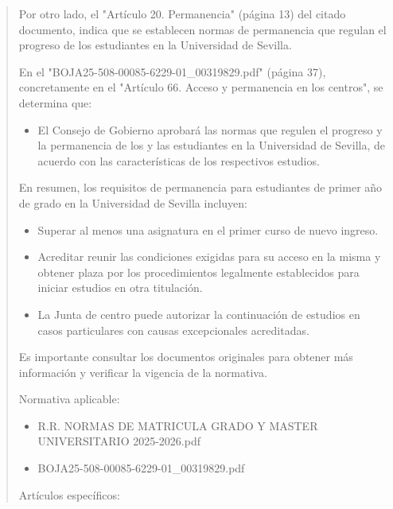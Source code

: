 \documentclass[12pt,a4paper,oneside]{report}
\begin{document}
\begin{itemize}
\begin{itemize}
\begin{quote}
Por otro lado, el "Artículo 20. Permanencia" (página 13) del citado documento, indica que se establecen normas de permanencia que regulan el progreso de los estudiantes en la Universidad de Sevilla.

En el "BOJA25-508-00085-6229-01\_00319829.pdf" (página 37), concretamente en el "Artículo 66. Acceso y permanencia en los centros", se determina que:

\begin{itemize}
  \item El Consejo de Gobierno aprobará las normas que regulen el progreso y la permanencia de los y las estudiantes en la Universidad de Sevilla, de acuerdo con las características de los respectivos estudios.
\end{itemize}

En resumen, los requisitos de permanencia para estudiantes de primer año de grado en la Universidad de Sevilla incluyen:

\begin{itemize}
  \item Superar al menos una asignatura en el primer curso de nuevo ingreso.
  \item Acreditar reunir las condiciones exigidas para su acceso en la misma y obtener plaza por los procedimientos legalmente establecidos para iniciar estudios en otra titulación.
  \item La Junta de centro puede autorizar la continuación de estudios en casos particulares con causas excepcionales acreditadas.
\end{itemize}

Es importante consultar los documentos originales para obtener más información y verificar la vigencia de la normativa. 

Normativa aplicable:

\begin{itemize}
  \item R.R. NORMAS DE MATRICULA GRADO Y MASTER UNIVERSITARIO 2025-2026.pdf
  \item BOJA25-508-00085-6229-01\_00319829.pdf 
\end{itemize}

Artículos específicos:


\end{quote}
\end{itemize}
\end{itemize}
\end{document}
